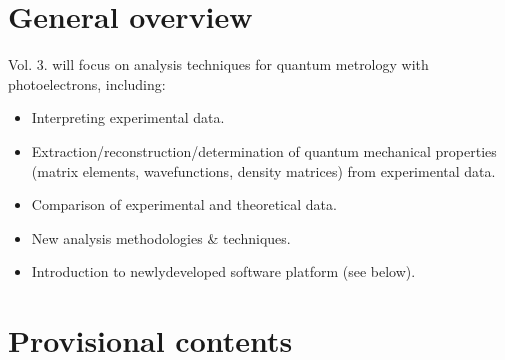 \documentclass[letterpaper,table,10pt,english]{jupyterBook}
\begin{document}
\section{General overview}
\label{\detokenize{frontmatter/overview_270122:general-overview}}
\sphinxAtStartPar
Vol. 3. will focus on analysis techniques for quantum metrology with photoelectrons, including:
\begin{itemize}
\item {} 
\sphinxAtStartPar
Interpreting experimental data.

\item {} 
\sphinxAtStartPar
Extraction/reconstruction/determination of quantum mechanical properties (matrix elements, wavefunctions, density matrices) from experimental data.

\item {} 
\sphinxAtStartPar
Comparison of experimental and theoretical data.

\item {} 
\sphinxAtStartPar
New analysis methodologies \& techniques.

\item {} 
\sphinxAtStartPar
Introduction to newly\sphinxhyphen{}developed software platform (see below).

\end{itemize}


\section{Provisional contents}
\label{\detokenize{frontmatter/overview_270122:provisional-contents}}
\end{document}
